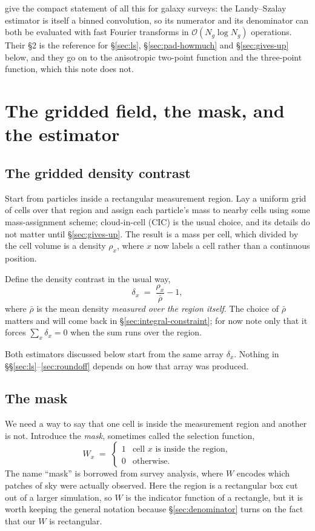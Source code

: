 \documentclass[12pt]{article}
\newcommand{\W}{W}
\begin{document}
\citet{Slepian2016} give the compact statement of all this for galaxy surveys:
the Landy--Szalay estimator is itself a binned convolution, so its numerator
and its denominator can both be evaluated with fast Fourier transforms in
$\mathcal{O}(N_g \log N_g)$ operations.  Their \S2 is the reference for
\S\ref{sec:ls}, \S\ref{sec:pad-howmuch} and \S\ref{sec:gives-up} below, and
they go on to the anisotropic two-point function and the three-point function,
which this note does not.

\section{The gridded field, the mask, and the estimator}\label{sec:setup}

\subsection{The gridded density contrast}

Start from particles inside a rectangular measurement region.  Lay a uniform
grid of cells over that region and assign each particle's mass to nearby
cells using some mass-assignment scheme; cloud-in-cell (CIC) is the usual
choice, and its details do not matter until \S\ref{sec:gives-up}.  The result
is a mass per cell, which divided by the cell volume is a density $\rho_x$,
where $x$ now labels a cell rather than a continuous position.

Define the density contrast in the usual way,
\begin{equation}\label{eq:delta-def}
  \delta_x \;=\; \frac{\rho_x}{\bar\rho} - 1 ,
\end{equation}
where $\bar\rho$ is the mean density \emph{measured over the region itself}.
The choice of $\bar\rho$ matters and will come back in
\S\ref{sec:integral-constraint}; for now note only that it forces
$\sum_x \delta_x = 0$ when the sum runs over the region.

Both estimators discussed below start from the same array $\delta_x$.  Nothing
in \S\S\ref{sec:ls}--\ref{sec:roundoff} depends on how that array was
produced.

\subsection{The mask}

We need a way to say that one cell is inside the measurement region and
another is not.  Introduce the \emph{mask}, sometimes called the selection
function,
\begin{equation}\label{eq:mask}
  \W_x \;=\;
  \begin{cases}
    1 & \text{cell $x$ is inside the region},\\
    0 & \text{otherwise}.
  \end{cases}
\end{equation}
The name ``mask'' is borrowed from survey analysis, where $\W$ encodes which
patches of sky were actually observed.  Here the region is a rectangular box
cut out of a larger simulation, so $\W$ is the indicator function of a
rectangle, but it is worth keeping the general notation because
\S\ref{sec:denominator} turns on the fact that our $\W$ is rectangular.
\end{document}

